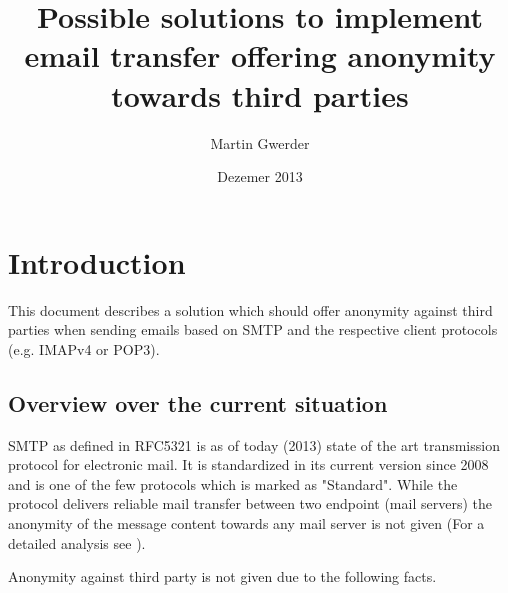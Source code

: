 \documentclass[11pt,a4paper]{book}
\begin{document}
\title{Possible solutions to implement email transfer offering anonymity towards third parties}
\author{Martin Gwerder}
\date{Dezemer 2013}
\maketitle

\begin{comment}
\begin{abstracts}        %
FIXME abstract is still missing
\end{abstracts}

\begin{acknowledgements}      %
FIXME family
FIXME Professor
FIXME university
\\
I would like to acknowledge the thousands of individuals who have coded for the LaTeX project for free. It is due to their efforts that we can generate professionally typeset PDFs now.
\end{acknowledgements}
\end{comment}


\tableofcontents
\listoftables
\listoffigures

\chapter{Introduction}
This document describes a solution which should offer anonymity against third parties when sending emails based on SMTP and the respective client protocols (e.g. IMAPv4 or POP3).

\section{Overview over the current situation}
SMTP as defined in RFC5321\cite{RFC5321} is as of today (2013)  state of the art transmission protocol for electronic mail. It is standardized in its current version since 2008 and is one of the few protocols which is marked as "Standard". While the protocol delivers reliable mail transfer between two endpoint (mail servers) the anonymity of the message content towards any mail server is not given (For a detailed analysis see ).\par

Anonymity against third party is not given due to the following facts.
\end{document}
